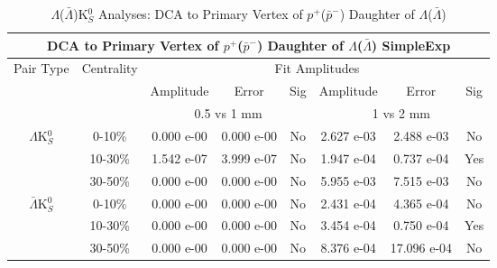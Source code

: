 \documentclass[../AnalysisNoteJBuxton.tex]{subfiles}
\begin{document}
\begin{table}
 \centering
 \begin{tabular}{|c|c|c|c|c||c|c|c|}
  \multicolumn{8}{c}{DCA to Primary Vertex of $p^{+}$($\bar{p}^{-}$) Daughter of $\Lambda$($\bar{\Lambda}$) SimpleExp} \\
  \hline
  \multirow{3}{*}{Pair Type} & \multirow{3}{*}{Centrality} & \multicolumn{6}{c|}{Fit Amplitudes} \\
  \cline{3-8}
   & & Amplitude & Error & Sig & Amplitude & Error & Sig \\  
  \cline{3-8}
   & & \multicolumn{3}{c||}{0.5 vs 1 mm} & \multicolumn{3}{c|}{1 vs 2 mm} \\  
  \hline  
  \multirow{3}{*}{$\Lambda$K$^{0}_{S}$}  
   &  0-10\% & 0.000 e-00 & 0.000 e-00 & No & 2.627 e-03 & 2.488 e-03 & No \\
   & 10-30\% & 1.542 e-07 & 3.999 e-07 & No & 1.947 e-04 & 0.737 e-04 & Yes \\
   & 30-50\% & 0.000 e-00 & 0.000 e-00 & No & 5.955 e-03 & 7.515 e-03 & No \\
  \hline  
  \multirow{3}{*}{$\bar{\Lambda}$K$^{0}_{S}$}  
   &  0-10\% & 0.000 e-00 & 0.000 e-00 & No & 2.431 e-04 & 4.365 e-04 & No \\
   & 10-30\% & 0.000 e-00 & 0.000 e-00 & No & 3.454 e-04 & 0.750 e-04 & Yes \\
   & 30-50\% & 0.000 e-00 & 0.000 e-00 & No & 8.376 e-04 & 17.096 e-04 & No \\
  \hline
 \end{tabular}
 \caption{$\Lambda$($\bar{\Lambda}$)K$^{0}_{S}$ Analyses: DCA to Primary Vertex of $p^{+}$($\bar{p}^{-}$) Daughter of $\Lambda$($\bar{\Lambda}$)}
 \label{tab:DcaToPrimVertexProtonDaughtOfLamLamK0_SimpleExp}
\end{table}
\end{document}
